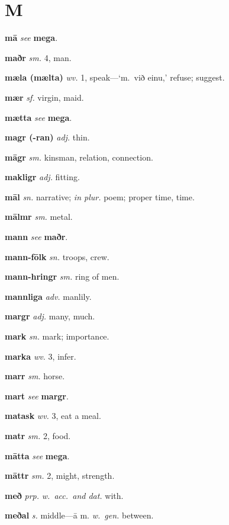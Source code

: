 \documentclass[12pt,letterpaper]{book}
\begin{document}
\chapter*{M}

\noindent
\textbf{mā} \textit{} \textit{see} \textbf{mega}.

\noindent
\textbf{maðr} \textit{sm.} 4, man.

\noindent
\textbf{mæla (mælta)} \textit{wv.} 1, speak---`m.\ við einu,' refuse; suggest.

\noindent
\textbf{mær} \textit{sf.} virgin, maid.

\noindent
\textbf{mætta} \textit{} \textit{see} \textbf{mega}.

\noindent
\textbf{magr (-ran)} \textit{adj.} thin.

\noindent
\textbf{māgr} \textit{sm.} kinsman, relation, connection.

\noindent
\textbf{makligr} \textit{adj.} fitting.

\noindent
\textbf{māl} \textit{sn.} narrative; \textit{in plur.} poem; proper time, time.

\noindent
\textbf{mālmr} \textit{sm.} metal.

\noindent
\textbf{mann} \textit{} \textit{see} \textbf{maðr}.

\noindent
\textbf{mann-fōlk} \textit{sn.} troops, crew.

\noindent
\textbf{mann-hringr} \textit{sm.} ring of men.

\noindent
\textbf{mannliga} \textit{adv.} manlily.

\noindent
\textbf{margr} \textit{adj.} many, much.

\noindent
\textbf{mark} \textit{sn.} mark; importance.

\noindent
\textbf{marka} \textit{wv.} 3, infer.

\noindent
\textbf{marr} \textit{sm.} horse.

\noindent
\textbf{mart} \textit{} \textit{see} \textbf{margr}.

\noindent
\textbf{matask} \textit{wv.} 3, eat a meal.

\noindent
\textbf{matr} \textit{sm.} 2, food.

\noindent
\textbf{mātta} \textit{} \textit{see} \textbf{mega}.

\noindent
\textbf{māttr} \textit{sm.} 2, might, strength.

\noindent
\textbf{með} \textit{prp.} \textit{w.\ acc.\ and dat.} with.

\noindent
\textbf{meðal} \textit{s.} middle---ā m.  \textit{w.\ gen.} between.
\end{document}
